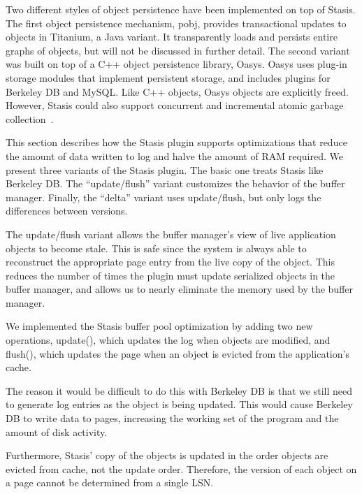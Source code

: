 \documentclass[letterpaper,twocolumn,10pt]{article}
\newcommand{\yad}{Stasis\xspace}
\newcommand{\yads}{Stasis'\xspace}
\newcommand{\oasys}{Oasys\xspace}
\begin{document}
Two different styles of object persistence have been implemented
on top of \yad.
%
The first object persistence mechanism, pobj, provides transactional
updates to objects in Titanium, a Java variant.  It transparently
loads and persists entire graphs of objects, but will not be discussed
in further detail.  The second variant was built on top of a C++
object persistence library, \oasys.  \oasys uses plug-in storage
modules that implement persistent storage, and includes plugins for
Berkeley DB and MySQL.  Like C++ objects, \oasys objects are
explicitly freed.  However, \yad could also support 
concurrent and incremental atomic garbage collection~\cite{stableHeap}.

This section describes how the \yad plugin supports optimizations that reduce the
amount of data written to log and halve the amount of RAM required.
We present three variants of the \yad plugin.  The basic one treats
\yad like Berkeley DB.  The ``update/flush'' variant
customizes the behavior of the buffer manager. Finally, the 
``delta'' variant uses update/flush, but only logs the differences
between versions.

The update/flush variant allows the buffer manager's view of live
application objects to become stale.  This is safe since the system is
always able to reconstruct the appropriate page entry from the live
copy of the object.  This reduces the number of times the
plugin must update serialized objects in the buffer manager, and
allows us to nearly eliminate the memory used by the
buffer manager.  

We implemented the \yad buffer pool optimization by adding two new
operations, update(), which updates the log when objects are modified, and flush(), which
updates the page when an object is evicted from the application's cache.  

The reason it would be difficult to do this with Berkeley DB is that
we still need to generate log entries as the object is being updated.
  This would cause Berkeley DB to write data to pages,
increasing the working set of the program and the amount of disk activity.

Furthermore, \yads copy of the objects is updated in the order objects
are evicted from cache, not the update order.
Therefore, the version of each object on a page cannot be determined
from a single LSN.
\end{document}
